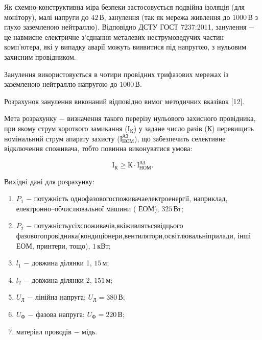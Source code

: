 	Як схемно-конструктивна міра безпеки застосовується подвійна ізоляція (для монітору), малі напруги до $42 \, \text{В}$, занулення (так як мережа живлення до $1000 \, \text{В}$ з глухо заземленою нейтраллю). Відповідно ДСТУ ГОСТ 7237:2011, занулення $-$ це навмисне електричне з’єднання металевих неструмоведучих частин комп’ютера, які у випадку аварії можуть виявитися під напругою, з нульовим захисним провідником.

Занулення використовується в чотири провідних трифазових мережах із заземленою нейтраллю напругою до $1000 \, \text{В}$.

Розрахунок занулення виконаний відповідно вимог методичних вказівок [12].

Мета розрахунку $-$ визначення такого перерізу нульового захисного провідника, при якому струм короткого замикання ($\text{І}_{\text{К}}$) у задане число разів ($\text{К}$) перевищить номінальний струм апарату захисту ($\text{І}^{\text{АЗ}}_{\text{НОМ}}$), що забезпечить селективне відключення споживача, тобто повинна виконуватися умова:

\begin{equation}\label{eq:work1}
	\text{І}_{\text{К}} \ge \text{К} \cdot \text{І}^{\text{АЗ}}_{\text{НОМ}}.
\end{equation}

\vspace{1.5em}

Вихідні дані для розрахунку:

\begin{enumerate}
	\item $P_{1}$ $-$ потужність \hfill однофазового\hfill споживача\hfill електроенергії,\newline \hspace*{-18mm} наприклад, електронно–обчислювальної машини ( ЕОМ), $325 \, \text{Вт}$;
	\item $P_{2}$ $-$ потужність\hfill усіх\hfill споживачів,\hfill які\hfill живляться\hfill від\hfill цього\newline \hspace*{-18mm} фазового\hfill провідника\hfill (кондиціонери,\hfill вентилятори,\hfill освітлювальні\hfill прилади,\newline \hspace*{-18mm} інші ЕОМ, принтери, тощо), $1 \, \text{кВт}$;
	\item $l_{1}$ $-$ довжина ділянки 1, $15 \, \text{м}$;
	\item $l_{2}$ $-$ довжина ділянки 2, $151 \, \text{м}$;
	\item $U_{\text{Л}}$ $-$ лінійна напруга; $U_{\text{Л}} = 380 \, \text{В}$; 
	\item $U_{\text{Ф}}$ $-$ фазова напруга; $U_{\text{Ф}} = 220 \, \text{В}$; 
	\item матеріал проводів $-$ мідь.
\end{enumerate}

